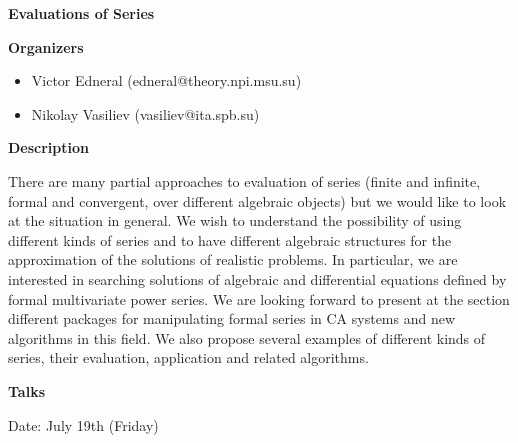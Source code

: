 \begin{center}
{\LARGE \bf Evaluations of Series
}
\end{center}
\bigskip

\noindent
{\bf Organizers}

\medskip

\begin{itemize}

\item
Victor Edneral (edneral@theory.npi.msu.su)
\item
Nikolay Vasiliev (vasiliev@ita.spb.su)

\end{itemize}
\bigskip

\noindent
{\bf Description}
\medskip

There are many partial approaches to evaluation of series (finite and infinite, formal and
convergent, over different algebraic objects) but we would like to look at the situation in general.
We wish to understand the possibility of using different kinds of series and to have different
algebraic structures for the approximation of the solutions of realistic problems. In particular, we
are interested in searching solutions of algebraic and differential equations defined by formal
multivariate power series. We are looking forward to present at the section different packages for
manipulating formal series in CA systems and new algorithms in this field. We also propose
several examples of different kinds of series, their evaluation, application and related algorithms. 

\bigskip
\noindent
{\bf Talks}
\medskip

Date: July 19th (Friday) 

